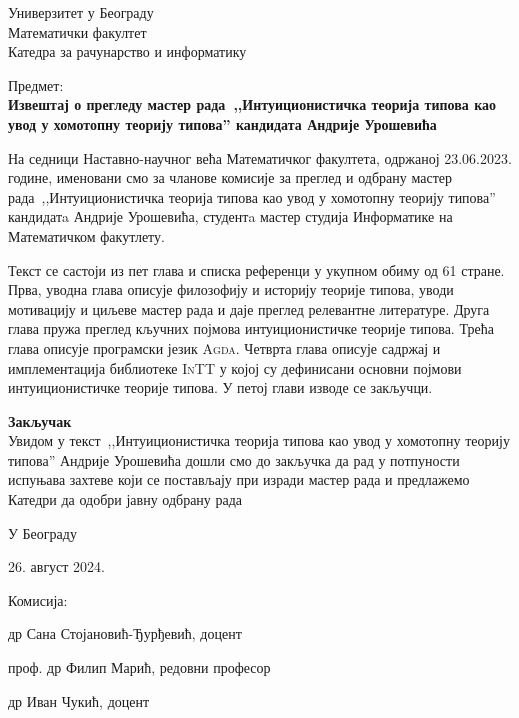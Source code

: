 \documentclass[a4paper]{letter}
\begin{document}
Универзитет у Београду\\
Математички факултет\\
Катедра за рачунарство и информатику

\vspace{2cm}

Предмет:\\
\textbf{Извештај о прегледу мастер рада~,,Интуиционистичка теорија типова као увод у хомотопну теорију типова'' кандидата Андрије Урошевића}

\vspace{0.6cm}

На седници Наставно-научног већа Математичког факултета, одржаној 23.06.2023. године,
именовани смо за чланове комисије за преглед и одбрану мастер рада~,,Интуиционистичка теорија типова као увод у хомотопну теорију типова'' кандидатa Андрије Урошевића, студентa
мастер студија Информатике на Математичком факутлету.

Текст се састоји из пет глава и списка референци у укупном обиму од 61 стране. Прва, уводна
глава описује филозофију и историју теорије типова, уводи мотивацију и циљеве мастер рада и даје преглед релевантне литературе. Друга глава пружа преглед
кључних појмова интуиционистичке теорије типова. Трећа
глава описује програмски језик \textsc{Agda}. Четврта глава описује садржај и имплементација библиотеке \textsc{InTT} у којој су дефинисани основни појмови интуиционистичке теорије типова. У петој глави изводе се закључци.

\vspace{0.4cm}

\textbf{Закључак}\\
Увидом у текст~,,Интуиционистичка теорија типова као увод у хомотопну теорију типова''
Андрије Урошевића дошли смо до закључка да рад у потпуности испуњава захтеве који се
постављају при изради мастер рада и предлажемо Катедри да одобри јавну одбрану рада

\vspace{1.2cm}

У Београду

26. август 2024.

\vspace{0.5cm}

Комисија:

др Сана Стојановић-Ђурђевић, доцент

проф. др Филип Марић, редовни професор

др Иван Чукић, доцент
\end{document}
